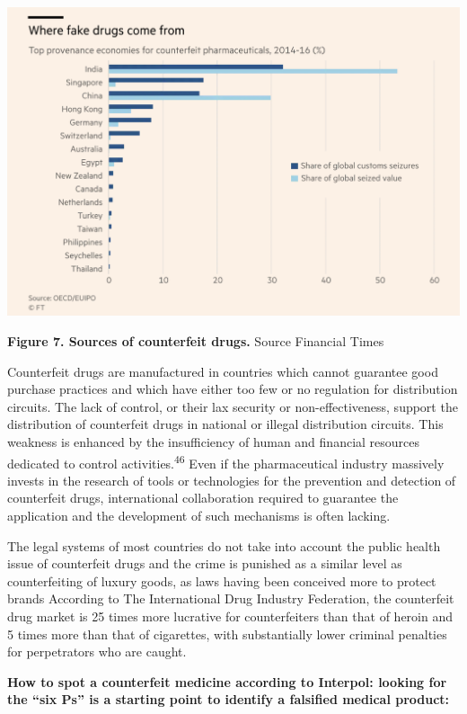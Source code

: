 \documentclass[
  11pt,
  paper=a4,
  ,captions=tableheading
]{scrartcl}
\begin{document}
\includegraphics{images/counterfits.png}

\textbf{Figure 7. Sources of counterfeit drugs.} Source Financial Times

Counterfeit drugs are manufactured in countries which cannot guarantee
good purchase practices and which have either too few or no regulation
for distribution circuits. The lack of control, or their lax security or
non-effectiveness, support the distribution of counterfeit drugs in
national or illegal distribution circuits. This weakness is enhanced by
the insufficiency of human and financial resources dedicated to control
activities.\textsuperscript{46} Even if the pharmaceutical industry
massively invests in the research of tools or technologies for the
prevention and detection of counterfeit drugs, international
collaboration required to guarantee the application and the development
of such mechanisms is often lacking.

The legal systems of most countries do not take into account the public
health issue of counterfeit drugs and the crime is punished as a similar
level as counterfeiting of luxury goods, as laws having been conceived
more to protect brands According to The International Drug Industry
Federation, the counterfeit drug market is 25 times more lucrative for
counterfeiters than that of heroin and 5 times more than that of
cigarettes, with substantially lower criminal penalties for perpetrators
who are caught.

\textbf{How to spot a counterfeit medicine according to Interpol:
looking for the ``six Ps'' is a starting point to identify a falsified
medical product:}
\end{document}
